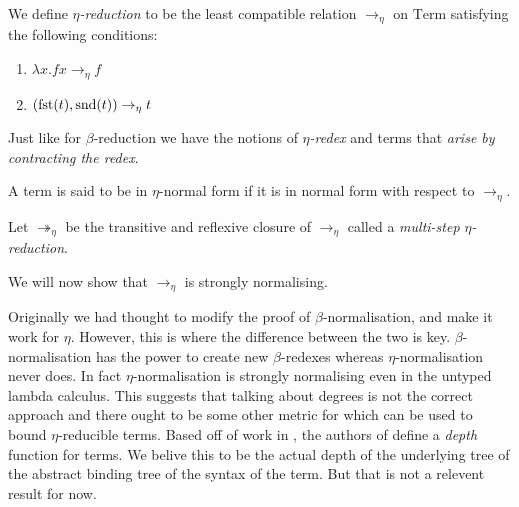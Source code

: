

\begin{defin}
    We define \emph{$\eta$-reduction} to be the least compatible relation $\to_{\eta}$ on $\mathrm{Term}$ satisfying the following conditions:
    \begin{enumerate}
        \item $\lambda x . f x \to_{\eta} f$
        \item $(\mathrm{fst}(t), \mathrm{snd}(t)) \to_{\eta} t$
    \end{enumerate}
    Just like for $\beta$-reduction we have the notions of \emph{$\eta$-redex} and terms that \emph{arise by contracting the redex}.
\end{defin}

\begin{defin}
    A term is said to be in $\eta$-normal form if it is in normal form with respect to $\to_{\eta}$.
\end{defin}

\begin{defin}
    Let $\twoheadrightarrow_{\eta}$ be the transitive and reflexive closure of $\to_{\eta}$ called a \emph{multi-step $\eta$-reduction}.
\end{defin}

We will now show that $\to_\eta$ is strongly normalising.

\begin{remark}
    Originally we had thought to modify the proof of $\beta$-normal\-isa\-tion, and make it work for $\eta$. However, this is where the difference between the two is key.
    $\beta$-normal\-isa\-tion has the power to create new $\beta$-redexes whereas $\eta$-normalisation never does. In fact $\eta$-normalisation is strongly normalising even in the untyped lambda calculus. This suggests that talking about degrees is not the correct approach and there ought to be some other metric for which can be used to bound $\eta$-reducible terms. Based off of work in \cite{Fortune1983}, the authors of \cite[Ex. 3.21]{Sorensen} define a \emph{depth} function for terms. We belive this to be the actual depth of the underlying tree of the abstract binding tree of the syntax of the term. But that is not a relevent result for now.
\end{remark}

